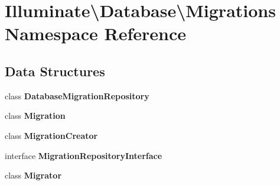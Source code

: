 \section{Illuminate\textbackslash{}Database\textbackslash{}Migrations Namespace Reference}
\label{namespace_illuminate_1_1_database_1_1_migrations}
\subsection*{Data Structures}
\begin{DoxyCompactItemize}
\item 
class {\bf Database\+Migration\+Repository}
\item 
class {\bf Migration}
\item 
class {\bf Migration\+Creator}
\item 
interface {\bf Migration\+Repository\+Interface}
\item 
class {\bf Migrator}
\end{DoxyCompactItemize}
